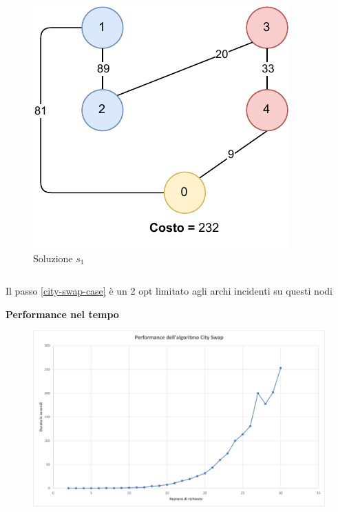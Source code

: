 \documentclass[9pt]{beamer}
\begin{document}
\begin{frame}{\subsecname}
{\begin{columns}[T,onlytextwidth]
\begin{figure}[h]
		\includegraphics[height=0.25\textheight]
		{../images/graph-greedy-pickup-first-solution-tsppd-with-two-customers}	
		\caption{Soluzione $s_1$}
		\end{figure}
	\end{columns}

	Il passo \ref{city-swap-case} è un 2 opt limitato agli archi incidenti su questi nodi
	}
\framebreak

	\textbf{Performance nel tempo}
      	\begin{figure}[h]
	\centering
	\includegraphics[width=\textwidth]
	{../charts/10 Performance dell'algoritmo City Swap}
	\end{figure}

\end{frame}
\end{document}
